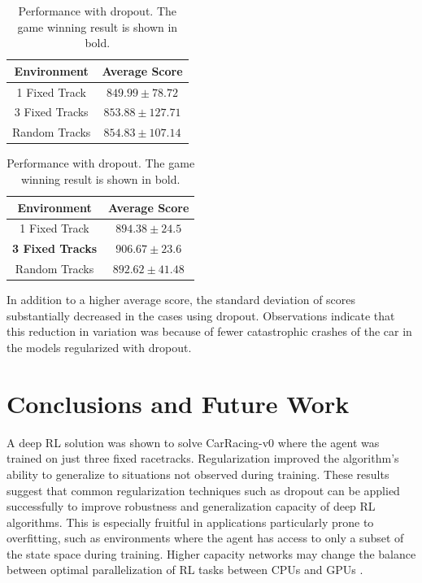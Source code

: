 \documentclass{article}
\begin{document}
\vspace{1mm}
\begin{table}[h!]
\begin{center}
\begin{minipage}[t]{.4\textwidth}
  \begin{tabular}{c|c}
    \textbf{Environment} & \textbf{Average Score}\\ \hline
    1 Fixed Track & $849.99\pm78.72$ \\
    3 Fixed Tracks & $853.88\pm127.71$ \\
    Random Tracks & $854.83\pm107.14$ \\
  \end{tabular}
  \vspace{.5mm}
  \caption{Performance without dropout}
  \label{tab:base_scores}
\end{minipage}
\hspace{1cm}
\begin{minipage}[t]{.4\textwidth}
  \begin{tabular}{c|c}
    \textbf{Environment} & \textbf{Average Score}\\
    \hline
    1 Fixed Track & $894.38\pm24.5$ \\
    \textbf{3 Fixed Tracks} & $\mathbf{906.67\pm23.6}$ \\
    Random Tracks & $892.62\pm41.48$ \\
  \end{tabular}
  \vspace{.5mm}
  \caption{Performance with dropout. The game winning result is shown
    in bold.}
  \label{tab:drop_scores}
\end{minipage}
\end{center}
\vspace{-5mm}
\end{table}

In addition to a higher average score, the standard
deviation of scores substantially decreased in the cases using
dropout. Observations indicate that this reduction in variation was
because of fewer catastrophic crashes of the car in the models
regularized with dropout.  

\section{Conclusions and Future Work}
A deep RL solution was shown to solve CarRacing-v0 where the agent was
trained on just three fixed racetracks. 
Regularization improved the algorithm's ability to generalize to
situations not observed during training. These results suggest
that common regularization techniques such as dropout can be
applied successfully to improve robustness and generalization capacity
of deep RL algorithms. This is especially fruitful in applications
particularly prone to overfitting, such as environments where the
agent has access to only a subset of the state space during training.
Higher capacity networks may change the balance between optimal
parallelization of RL tasks between CPUs and GPUs \cite{stooke2018accelerated}. 
\end{document}
